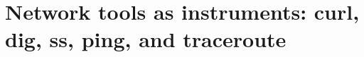 \chapter{Network tools as instruments: curl, dig, ss, ping, and traceroute}
\label{ch:network-tools-as-instruments-curl-dig}


